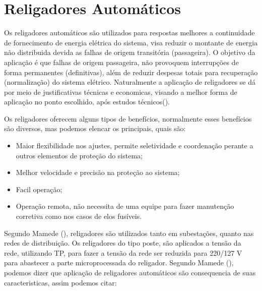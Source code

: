 \documentclass[oneside,openright,12pt]{ufsm_2021} %
\begin{document}
\section{Religadores Automáticos}

\par Os religadores automáticos são utilizados para respostas melhores a continuidade de fornecimento de energia elétrica do sistema, visa reduzir o montante de energia não distribuida devida as falhas de origem transitória (passageira). O objetivo da aplicação é que falhas de origem passageira, não provoquem interrupções de forma permanentes (definitivas), além de reduzir despesas totais para recuperação (normalização) do sistema elétrico. Naturalmente a aplicação de religadores se dá por meio de justificativas técnicas e economicas, visando a melhor forma de aplicação no ponto escolhido, após estudos técnicos(\cite{mamede_protecao_2024}).

\par Os religadores oferecem alguns tipos de benefícios, normalmente esses benefícios são diversos, mas podemos elencar os principais, quais são:
\begin{itemize}
	\item Maior flexibilidade nos ajustes, permite seletividade e coordenação perante a outros elementos de proteção do sistema;
	\item Melhor velocidade e precisão na proteção ao sistema;
	\item Facil operação;
	\item Operação remota, não necessita de uma equipe para fazer manutenção corretiva como nos casos de elos fusíveis.
\end{itemize}

\par Segundo Mamede (\citeyear{mamede_protecao_2024}), religadores são utilizados tanto em subestações, quanto nas redes de distribuição. Os religadores do tipo poste, são aplicados a tensão da rede, utilizando TP, para fazer a tensão da rede ser reduzida para 220/127 V para abastecer a parte microprocessada do religador. Segundo Mamede (\citeyear{mamede_protecao_2024}), podemos dizer que aplicação de religadores automáticos são consequencia de suas caracteristicas, assim podemos citar:
\end{document}
